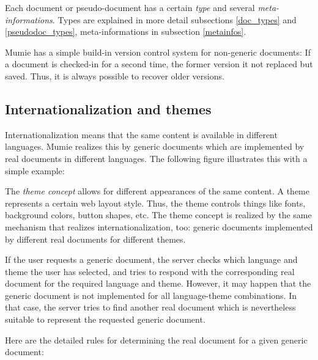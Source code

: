 \documentclass{generic}
\begin{document}
Each document or pseudo-document has a certain \emph{type} and several
\emph{meta-informations}. Types are explained in more detail subsections
\ref{doc_types} and \ref{pseudodoc_types}, meta-informations in subsection
\ref{metainfos}.

Mumie has a simple build-in version control system for non-generic documents:
If a document is checked-in for a second time, the former version it not
replaced but saved. Thus, it is always possible to recover older versions.

\subsection{Internationalization and themes}\label{intern_and_themes}

Internationalization means that the same content is available in different
languages. Mumie realizes this by generic documents which are implemented by
real documents in different languages. The following figure  illustrates this
with a simple example:


The \emph{theme concept} allows for different appearances of the same content.
A theme represents a certain web layout style. Thus, the theme controls things
like fonts, background colors, button shapes, etc. The theme concept is
realized by the same mechanism that realizes internationalization, too: generic
documents implemented by different real documents for different themes.

If the user requests a generic document, the server checks which language and
theme the user has selected, and tries to respond with the corresponding real
document for the required language and theme. However, it may happen that the
generic document is not implemented for all language-theme combinations. In
that case, the server tries to find another real document which is nevertheless
suitable to represent the requested generic document.

Here are the detailed rules for determining the real document for a given
generic document:
\end{document}
